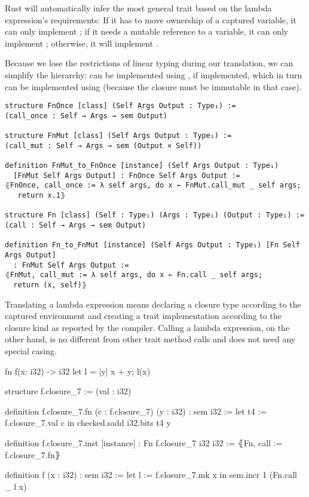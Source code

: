 Rust will automatically infer the most general trait based on the lambda
expression's requirements: If it has to move ownership of a captured variable, it
can only implement ; if it needs a mutable reference to a variable,
it can only implement ; otherwise, it will implement .

Because we lose the restrictions of linear typing during our translation, we can
simplify the hierarchy:  can be implemented using
, if implemented, which in turn can be implemented using
 (because the closure must be immutable in that case).

\begin{verbatim}
structure FnOnce [class] (Self Args Output : Type₁) :=
(call_once : Self → Args → sem Output)

structure FnMut [class] (Self Args Output : Type₁) :=
(call_mut : Self → Args → sem (Output × Self))

definition FnMut_to_FnOnce [instance] (Self Args Output : Type₁)
  [FnMut Self Args Output] : FnOnce Self Args Output :=
⦃FnOnce, call_once := λ self args, do x ← FnMut.call_mut _ self args;
   return x.1⦄

structure Fn [class] (Self : Type₁) (Args : Type₁) (Output : Type₁) :=
(call : Self → Args → sem Output)

definition Fn_to_FnMut [instance] (Self Args Output : Type₁) [Fn Self Args Output]
  : FnMut Self Args Output :=
⦃FnMut, call_mut := λ self args, do x ← Fn.call _ self args;
  return (x, self)⦄
\end{verbatim}

Translating a lambda expression means declaring a closure type according to the
captured environment and creating a trait implementation according to the
closure kind as reported by the compiler. Calling a lambda expression, on the
other hand, is no different from other trait method calls and does not need any
special casing.

\begin{sbs1}
fn f(x: i32) -> i32 {
  let l = |y| x + y;
  l(x)
}
\end{sbs1}
\begin{sbs2}
structure f.closure_7 := (val : i32)

definition f.closure_7.fn (c : f.closure_7) (y : i32) : sem i32 :=
let t4 := f.closure_7.val c in
checked.sadd i32.bits t4 y

definition f.closure_7.inst [instance] : Fn f.closure_7 i32 i32 :=
⦃Fn, call := f.closure_7.fn⦄

definition f (x : i32) : sem i32 :=
let l := f.closure_7.mk x in
sem.incr 1 (Fn.call _ l x)
\end{sbs2}
